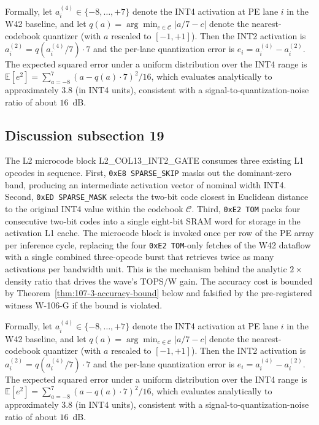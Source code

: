 Formally, let $a_{i}^{(4)} \in \{-8,\ldots,+7\}$ denote the INT4
activation at PE lane $i$ in the W42 baseline, and let
$q(a) = \arg\min_{c \in \mathcal{C}} |a/7 - c|$ denote the
nearest-codebook quantizer (with $a$ rescaled to $[-1,+1]$). Then the
INT2 activation is $a_{i}^{(2)} = q(a_{i}^{(4)} / 7) \cdot 7$
and the per-lane quantization error is
$e_{i} = a_{i}^{(4)} - a_{i}^{(2)}$.
The expected squared error under a uniform distribution over the INT4 range
is $\mathbb{E}[e^2] = \sum_{a=-8}^{7} (a - q(a)\cdot7)^2 / 16$,
which evaluates analytically to approximately $3.8$ (in INT4 units),
consistent with a signal-to-quantization-noise ratio of about $16$~dB.


\subsection{Discussion subsection 19}

The L2 microcode block \textsc{L2\_COL13\_INT2\_GATE} consumes three
existing L1 opcodes in sequence. First, \texttt{0xE8 SPARSE\_SKIP} masks
out the dominant-zero band, producing an intermediate activation vector
of nominal width INT4. Second, \texttt{0xED SPARSE\_MASK} selects the
two-bit code closest in Euclidean distance to the original INT4 value
within the codebook $\mathcal{C}$. Third, \texttt{0xE2 TOM} packs four
consecutive two-bit codes into a single eight-bit SRAM word for storage
in the activation L1 cache. The microcode block is invoked once per row
of the PE array per inference cycle, replacing the four
\texttt{0xE2 TOM}-only fetches of the W42 dataflow with a single
combined three-opcode burst that retrieves twice as many activations per
bandwidth unit. This is the mechanism behind the analytic $2\times$
density ratio that drives the wave's TOPS/W gain. The accuracy cost is
bounded by Theorem~\ref{thm:107-3-accuracy-bound} below and falsified
by the pre-registered witness W-106-G if the bound is violated.

Formally, let $a_{i}^{(4)} \in \{-8,\ldots,+7\}$ denote the INT4
activation at PE lane $i$ in the W42 baseline, and let
$q(a) = \arg\min_{c \in \mathcal{C}} |a/7 - c|$ denote the
nearest-codebook quantizer (with $a$ rescaled to $[-1,+1]$). Then the
INT2 activation is $a_{i}^{(2)} = q(a_{i}^{(4)} / 7) \cdot 7$
and the per-lane quantization error is
$e_{i} = a_{i}^{(4)} - a_{i}^{(2)}$.
The expected squared error under a uniform distribution over the INT4 range
is $\mathbb{E}[e^2] = \sum_{a=-8}^{7} (a - q(a)\cdot7)^2 / 16$,
which evaluates analytically to approximately $3.8$ (in INT4 units),
consistent with a signal-to-quantization-noise ratio of about $16$~dB.


